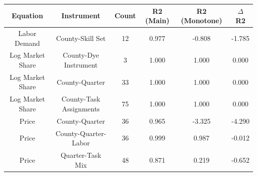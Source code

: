 
\centering
\begin{tabular}[t]{cccccc}
\toprule
Equation & Instrument & Count & R2 (Main) & R2 (Monotone) & $\Delta$ R2\\
\midrule
Labor Demand & County-Skill Set & 12 & 0.977 & -0.808 & -1.785\\
Log Market Share & County-Dye Instrument & 3 & 1.000 & 1.000 & 0.000\\
Log Market Share & County-Quarter & 33 & 1.000 & 1.000 & 0.000\\
Log Market Share & County-Task Assignments & 75 & 1.000 & 1.000 & 0.000\\
Price & County-Quarter & 36 & 0.965 & -3.325 & -4.290\\
Price & County-Quarter-Labor & 36 & 0.999 & 0.987 & -0.012\\
Price & Quarter-Task Mix & 48 & 0.871 & 0.219 & -0.652\\
\bottomrule
\end{tabular}